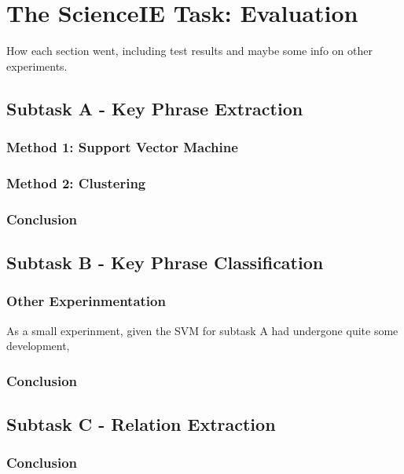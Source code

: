 \chapter{The ScienceIE Task: Evaluation}

How each section went, including test results and maybe some info on other experiments.

\section{Subtask A - Key Phrase Extraction}

\subsection{Method 1: Support Vector Machine}

\subsection{Method 2: Clustering}

\subsection{Conclusion}

\section{Subtask B - Key Phrase Classification}

\subsection{Other Experinmentation}
As a small experinment, given the SVM for subtask A had undergone quite some development, 

\subsection{Conclusion}

\section{Subtask C - Relation Extraction}

\subsection{Conclusion}

